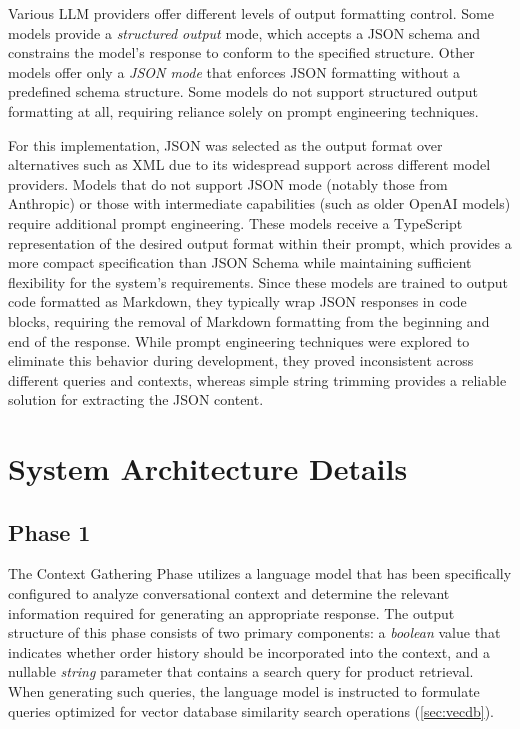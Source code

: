 Various LLM providers offer different levels of output formatting control. Some models provide a \textit{structured output} mode, which accepts a JSON schema and constrains the model's response to conform to the specified structure. Other models offer only a \textit{JSON mode} that enforces JSON formatting without a predefined schema structure.
Some models do not support structured output formatting at all, requiring reliance solely on prompt engineering techniques.

For this implementation, JSON was selected as the output format over alternatives such as XML due to its widespread support across different model providers.
Models that do not support JSON mode (notably those from Anthropic) or those with intermediate capabilities (such as older OpenAI models) require additional prompt engineering.
These models receive a TypeScript representation of the desired output format within their prompt, which provides a more compact specification than JSON Schema while maintaining sufficient flexibility for the system's requirements.
Since these models are trained to output code formatted as Markdown, they typically wrap JSON responses in code blocks, requiring the removal of Markdown formatting from the beginning and end of the response.
While prompt engineering techniques were explored to eliminate this behavior during development, they proved inconsistent across different queries and contexts, whereas simple string trimming provides a reliable solution for extracting the JSON content.

\section{System Architecture Details}

\subsection{Phase 1}

The Context Gathering Phase utilizes a language model that has been specifically configured to analyze conversational context and determine the relevant information required for generating an appropriate response.
The output structure of this phase consists of two primary components: a \textit{boolean} value that indicates whether order history should be incorporated into the context, and a nullable \textit{string} parameter that contains a search query for product retrieval.
When generating such queries, the language model is instructed to formulate queries optimized for vector database similarity search operations (\cref{sec:vecdb}).

